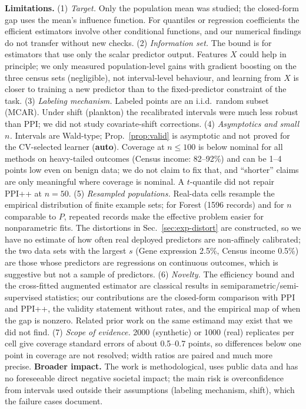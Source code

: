 \textbf{Limitations.}
(1) \emph{Target.} Only the population mean was studied; the closed-form gap uses the mean's influence function. For quantiles or regression coefficients the efficient estimators involve other conditional functions, and our numerical findings do not transfer without new checks.
(2) \emph{Information set.} The bound is for estimators that use only the scalar predictor output. Features $X$ could help in principle; we only measured population-level gains with gradient boosting on the three census sets (negligible), not interval-level behaviour, and learning from $X$ is closer to training a new predictor than to the fixed-predictor constraint of the task.
(3) \emph{Labeling mechanism.} Labeled points are an i.i.d.\ random subset (MCAR). Under shift (plankton) the recalibrated intervals were much less robust than PPI; we did not study covariate-shift corrections.
(4) \emph{Asymptotics and small $n$.} Intervals are Wald-type; Prop.~\ref{prop:valid} is asymptotic and not proved for the CV-selected learner (\textbf{auto}). Coverage at $n\le100$ is below nominal for all methods on heavy-tailed outcomes (Census income: 82--92\%) and can be 1--4 points low even on benign data; we do not claim to fix that, and ``shorter'' claims are only meaningful where coverage is nominal. A $t$-quantile did not repair PPI++ at $n=50$.
(5) \emph{Resampled populations.} Real-data cells resample the empirical distribution of finite example sets; for Forest (1596 records) and for $n$ comparable to $P$, repeated records make the effective problem easier for nonparametric fits. The distortions in Sec.~\ref{sec:exp-distort} are constructed, so we have no estimate of how often real deployed predictors are non-affinely calibrated; the two data sets with the largest $s$ (Gene expression 2.5\%, Census income 0.5\%) are those whose predictors are regressions on continuous outcomes, which is suggestive but not a sample of predictors.
(6) \emph{Novelty.} The efficiency bound and the cross-fitted augmented estimator are classical results in semiparametric/semi-supervised statistics; our contributions are the closed-form comparison with PPI and PPI++, the validity statement without rates, and the empirical map of when the gap is nonzero. Related prior work on the same estimand may exist that we did not find.
(7) \emph{Scope of evidence.} 2000 (synthetic) or 1000 (real) replicates per cell give coverage standard errors of about 0.5--0.7 points, so differences below one point in coverage are not resolved; width ratios are paired and much more precise.
\textbf{Broader impact.} The work is methodological, uses public data and has no foreseeable direct negative societal impact; the main risk is overconfidence from intervals used outside their assumptions (labeling mechanism, shift), which the failure cases document.
